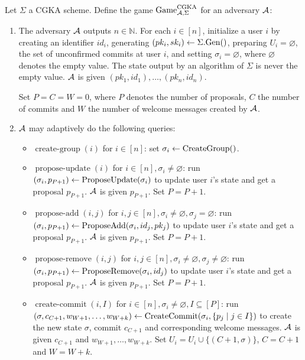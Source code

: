 \begin{definition}
	Let $\Sigma$ a CGKA scheme. Define the game $\mathrm{Game}_{\mathcal{A}, \Sigma}^{\mathrm{CGKA}}$ for an adversary $\mathcal{A}$:
	\begin{enumerate}[1.]
		\item \label{def:cgka-game-step-1} The adversary $\mathcal{A}$ outputs $n \in \mathbb{N}$. For each $i \in [n]$, initialize a user $i$ by creating an identifier $id_i$, generating $(pk_i, sk_i) \leftarrow \Sigma.\mathrm{Gen}()$, preparing $U_i = \varnothing$, the set of unconfirmed commits at user $i$, and setting $\sigma_i = \varnothing$, where $\varnothing$ denotes the empty value. The state output by an algorithm of $\Sigma$ is never the empty value. $\mathcal{A}$ is given $(pk_1, id_1), \ldots, (pk_n, id_n)$.

		      Set $P = C = W = 0$, where $P$ denotes the number of proposals, $C$ the number of commits and $W$ the number of welcome messages created by $\mathcal{A}$.
		\item $\mathcal{A}$ may adaptively do the following queries:
		      \begin{itemize}
			      \item $\operatorname{create-group}(i)$ for $i \in [n]$: set $\sigma_i \leftarrow \operatorname{CreateGroup}()$.
			      \item $\operatorname{propose-update}(i)$ for $i \in [n], \sigma_i \neq \varnothing$: run $(\sigma_i, p_{P + 1}) \leftarrow \operatorname{ProposeUpdate}(\sigma_i)$ to update user $i$'s state and get a proposal $p_{P + 1}$. $\mathcal{A}$ is given $p_{P + 1}$. Set $P = P + 1$.
			      \item $\operatorname{propose-add}(i, j)$ for $i, j \in [n], \sigma_i \neq \varnothing, \sigma_j = \varnothing$: run $(\sigma_i, p_{P + 1}) \leftarrow \operatorname{ProposeAdd}(\sigma_i, id_j, pk_j)$ to update user $i$'s state and get a proposal $p_{P + 1}$. $\mathcal{A}$ is given $p_{P + 1}$. Set $P = P + 1$.
			      \item $\operatorname{propose-remove}(i, j)$ for $i, j \in [n], \sigma_i \neq \varnothing, \sigma_j \neq \varnothing$: run $(\sigma_i, p_{P + 1}) \leftarrow \operatorname{ProposeRemove}(\sigma_i, id_j)$ to update user $i$'s state and get a proposal $p_{P + 1}$. $\mathcal{A}$ is given $p_{P + 1}$. Set $P = P + 1$.
			      \item $\operatorname{create-commit}(i, I)$ for $i \in [n], \sigma_i \neq \varnothing, I \subseteq [P]$: run $(\sigma, c_{C + 1}, w_{W + 1}, \ldots, w_{W + k}) \leftarrow \operatorname{CreateCommit}(\sigma_i, \{p_j \mid j \in I\})$ to create the new state $\sigma$, commit $c_{C + 1}$ and corresponding welcome messages. $\mathcal{A}$ is given $c_{C + 1}$ and $w_{W + 1}, \ldots, w_{W + k}$. Set $U_i = U_i \cup \{(C + 1, \sigma)\}$, $C = C + 1$ and $W = W + k$.

\end{itemize}
\end{enumerate}
\end{definition}
